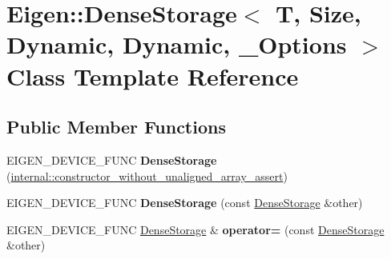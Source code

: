 \hypertarget{class_eigen_1_1_dense_storage_3_01_t_00_01_size_00_01_dynamic_00_01_dynamic_00_01___options_01_4}{}\section{Eigen\+::Dense\+Storage$<$ T, Size, Dynamic, Dynamic, \+\_\+\+Options $>$ Class Template Reference}
\label{class_eigen_1_1_dense_storage_3_01_t_00_01_size_00_01_dynamic_00_01_dynamic_00_01___options_01_4}
\subsection*{Public Member Functions}
\begin{DoxyCompactItemize}
\item 
\mbox{\label{class_eigen_1_1_dense_storage_3_01_t_00_01_size_00_01_dynamic_00_01_dynamic_00_01___options_01_4_a8de609a6c9f045d7e8e9936ddfcfecf6}} 
E\+I\+G\+E\+N\+\_\+\+D\+E\+V\+I\+C\+E\+\_\+\+F\+U\+NC {\bfseries Dense\+Storage} (\mbox{\hyperlink{struct_eigen_1_1internal_1_1constructor__without__unaligned__array__assert}{internal\+::constructor\+\_\+without\+\_\+unaligned\+\_\+array\+\_\+assert}})
\item 
\mbox{\label{class_eigen_1_1_dense_storage_3_01_t_00_01_size_00_01_dynamic_00_01_dynamic_00_01___options_01_4_a42d45ee76bf4a768d620ced260705030}} 
E\+I\+G\+E\+N\+\_\+\+D\+E\+V\+I\+C\+E\+\_\+\+F\+U\+NC {\bfseries Dense\+Storage} (const \mbox{\hyperlink{class_eigen_1_1_dense_storage}{Dense\+Storage}} \&other)
\item 
\mbox{\label{class_eigen_1_1_dense_storage_3_01_t_00_01_size_00_01_dynamic_00_01_dynamic_00_01___options_01_4_a61e87e4dba324fd4bd3e54bae19e3214}} 
E\+I\+G\+E\+N\+\_\+\+D\+E\+V\+I\+C\+E\+\_\+\+F\+U\+NC \mbox{\hyperlink{class_eigen_1_1_dense_storage}{Dense\+Storage}} \& {\bfseries operator=} (const \mbox{\hyperlink{class_eigen_1_1_dense_storage}{Dense\+Storage}} \&other)
\item 
\mbox{\label{class_eigen_1_1_dense_storage_3_01_t_00_01_size_00_01_dynamic_00_01_dynamic_00_01___options_01_4_aa58cf9abb23cc7374a15f836596612d3}} 

\end{DoxyCompactItemize}
